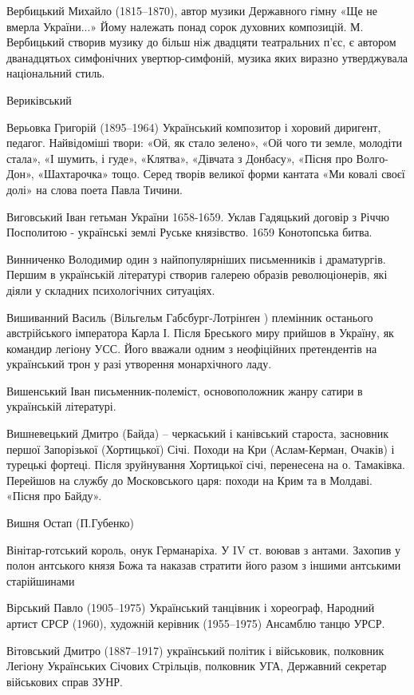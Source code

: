 Вербицький Михайло  (1815–1870), автор музики Державного гімну «Ще не вмерла України...» Йому належать понад сорок духовних композицій. М. Вербицький створив музику до більш ніж двадцяти театральних п’єс, є автором дванадцятьох симфонічних увертюр-симфоній, музика яких виразно утверджувала національний стиль. 

Вериківський

Верьовка Григорій (1895–1964) Український композитор і хоровий диригент, педагог. Найвідоміші твори: «Ой, як стало зелено», «Ой чого ти земле, молодіти стала», «І шумить, і гуде», «Клятва», «Дівчата з Донбасу», «Пісня про Волго-Дон», «Шахтарочка» тощо. Серед творів великої форми кантата «Ми ковалі своєї долі» на слова поета Павла Тичини.

Виговський  Іван гетьман України 1658-1659. Уклав Гадяцький договір з Річчю Посполитою - українські землі Руське князівство. 1659 Конотопська битва.

Винниченко Володимир один з найпопулярніших письменників і драматургів. Першим в українській літературі створив галерею образів революціонерів, які діяли у складних психологічних ситуаціях. 

Вишиванний Василь (Вільгельм  Габсбург-Лотрінґен ) племінник останього австрійського імператора Карла І. Після Бреського миру прийшов в Україну, як командир легіону УСС. Його вважали одним з неофіційних претендентів на український трон у разі утворення монархічного ладу.   

Вишенський  Іван письменник-полеміст, основоположник жанру сатири в українській літературі.

Вишневецький Дмитро  (Байда) – черкаський і канівський староста, засновник першої Запорізької (Хортицької) Січі. Походи на Кри (Аслам-Керман, Очаків) і турецькі фортеці. Після зруйнування Хортицької січі, перенесена на о. Тамаківка. Перейшов на службу до Московського царя: походи на Крим та в Молдаві. «Пісня про Байду».

Вишня Остап (П.Губенко) 

Вінітар-готський король, онук Германаріха. У IV ст. воював з антами. Захопив у полон антського князя Божа та наказав стратити його разом з іншими антськими старійшинами

Вірський Павло (1905–1975) Український танцівник і хореограф, Народний артист СРСР (1960), художній керівник (1955–1975) Ансамблю танцю УРСР.

Вітовський Дмитро (1887–1917) український політик і військовик, полковник Легіону Українських Січових Стрільців, полковник УГА, Державний секретар військових справ ЗУНР. 

